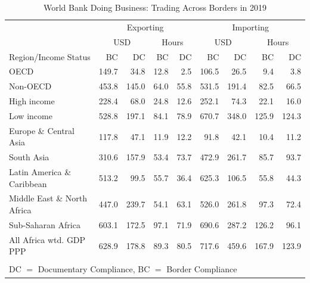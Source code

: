 \documentclass[a4paper]{article}
\begin{document}
\begin{table}[H] %
\centering
\caption{\label{tab:DB_TAB} World Bank Doing Business: Trading Across Borders in 2019}
\vspace{2mm}
\begin{tabular}{lrrrrrrrr}
  \toprule
 & \multicolumn{4}{c}{Exporting} & \multicolumn{4}{c}{Importing} \\  & \multicolumn{2}{c}{USD} & \multicolumn{2}{c}{Hours} & \multicolumn{2}{c}{USD} & \multicolumn{2}{c}{Hours} \\
Region/Income Status & BC & DC & BC & DC & BC & DC & BC & DC \\ 
  \midrule
  OECD & 149.7 & 34.8 & 12.8 & 2.5 & 106.5 & 26.5 & 9.4 & 3.8 \\ 
  Non-OECD & 453.8 & 145.0 & 64.0 & 55.8 & 531.5 & 191.4 & 82.5 & 66.5 \\ \midrule
High income & 228.4 & 68.0 & 24.8 & 12.6 & 252.1 & 74.3 & 22.1 & 16.0 \\ 
  Low income & 528.8 & 197.1 & 84.1 & 78.9 & 670.7 & 348.0 & 125.9 & 124.3 \\ \midrule 
Europe \& Central Asia & 117.8 & 47.1 & 11.9 & 12.2 & 91.8 & 42.1 & 10.4 & 11.2 \\ 
  South Asia & 310.6 & 157.9 & 53.4 & 73.7 & 472.9 & 261.7 & 85.7 & 93.7 \\ 
  Latin America \& Caribbean & 513.2 & 99.5 & 55.7 & 36.4 & 625.3 & 106.5 & 55.8 & 44.3 \\ 
  Middle East \& North Africa & 447.0 & 239.7 & 54.1 & 63.1 & 526.0 & 261.8 & 97.3 & 72.4 \\ 
  Sub-Saharan Africa & 603.1 & 172.5 & 97.1 & 71.9 & 690.6 & 287.2 & 126.2 & 96.1 \\ \midrule
  All Africa wtd. GDP PPP & 628.9 & 178.8 & 89.3 & 80.5 & 717.6 & 459.6 & 167.9 & 123.9 \\ 
   \bottomrule \\ [-0.9em]
      \multicolumn{8}{l}{DC $=$ Documentary Compliance, BC $=$ Border Compliance} 
\end{tabular}
\end{table}
\end{document}
